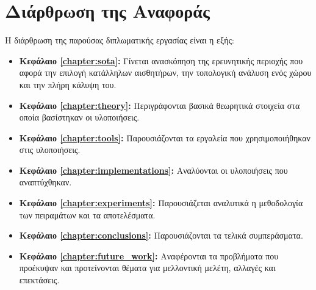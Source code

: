 \section{Διάρθρωση της Αναφοράς}
\label{section:layout}

Η διάρθρωση της παρούσας διπλωματικής εργασίας είναι η εξής:

\begin{itemize}
  \item{\textbf{Κεφάλαιο \ref{chapter:sota}:}
      Γίνεται ανασκόπηση της ερευνητικής περιοχής που αφορά την επιλογή κατάλληλων αισθητήρων, την τοπολογική ανάλυση ενός χώρου και την πλήρη κάλυψη του.
    }
  \item{\textbf{Κεφάλαιο \ref{chapter:theory}:} Περιγράφονται βασικά θεωρητικά στοιχεία
      στα οποία βασίστηκαν οι υλοποιήσεις.
    }
  \item{\textbf{Κεφάλαιο \ref{chapter:tools}:} Παρουσιάζονται τα εργαλεία που χρησιμοποιήθηκαν στις
      υλοποιήσεις.
    }
  \item{\textbf{Κεφάλαιο \ref{chapter:implementations}:} Αναλύονται οι υλοποιήσεις που αναπτύχθηκαν.
    }
  \item{\textbf{Κεφάλαιο \ref{chapter:experiments}:} Παρουσιάζεται αναλυτικά η μεθοδολογία των πειραμάτων και τα αποτελέσματα.
    }
  \item{\textbf{Κεφάλαιο \ref{chapter:conclusions}:} Παρουσιάζονται τα τελικά συμπεράσματα.
    }
  \item{\textbf{Κεφάλαιο \ref{chapter:future_work}:} Αναφέρονται τα
      προβλήματα που προέκυψαν και προτείνονται θέματα για μελλοντική
      μελέτη, αλλαγές και επεκτάσεις.
    }
\end{itemize}

